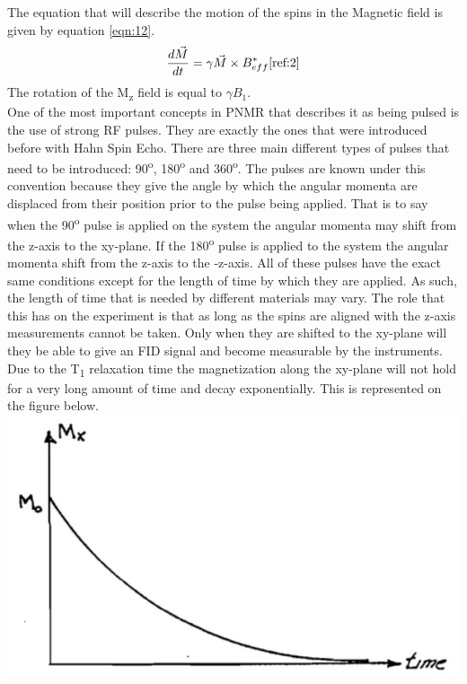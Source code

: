 \documentclass{article}
\begin{document}
{\begin{multicols}{2}
\label{fig:3}
\justify
The equation that will describe the motion of the spins in the Magnetic field 
is given by equation \ref{eqn:12}.
\begin{equation}
\frac{d\vec{M}}{dt} = \gamma\vec{M}\times B_{eff}^{*}
\label{eqn:12}
\cite{ref:2}
\end{equation}
The rotation of the M\textsubscript{z} field is equal to $\gamma B_1$.
\\
One of the most important concepts in PNMR that describes it as being pulsed is 
the use of strong RF pulses. They are exactly the ones that were introduced 
before with Hahn Spin Echo. There are three main different types of pulses that 
need to be introduced: 90\textsuperscript{o}, 180\textsuperscript{o} and
360\textsuperscript{o}. The pulses are known under this convention because 
they give the angle by which the angular momenta are displaced from their 
position prior to the pulse being applied. That is to say when the 90\textsuperscript{o} 
pulse is applied on the system the angular momenta may shift from the z-axis to 
the xy-plane. If the 180\textsuperscript{o} pulse is applied to the system the 
angular momenta shift from the z-axis to the -z-axis. All of these pulses have 
the exact same conditions except for the length of time by which they are 
applied. As such, the length of time that is needed by different materials may 
vary. The role that this has on the experiment is that as long as the spins are 
aligned with the z-axis measurements cannot be taken. Only when they are 
shifted to the xy-plane will they be able to give an FID signal and become 
measurable by the instruments. Due to the T\textsubscript{1} relaxation time 
the magnetization along the xy-plane will not hold for a very long amount of 
time and decay exponentially. This is represented on the figure below.
\center
\includegraphics[width=\linewidth]{pic-de-manual/t2.jpg}

\end{multicols}}
\end{document}
